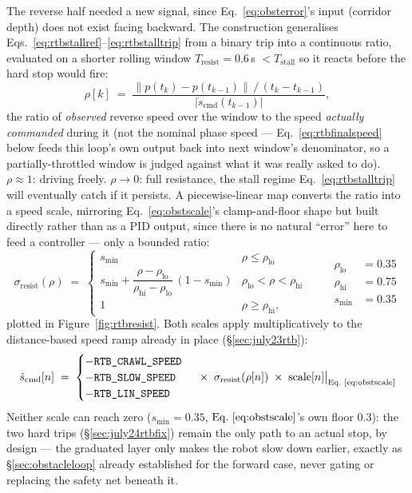 The reverse half needed a new signal, since Eq.~\ref{eq:obsterror}'s input
(corridor depth) does not exist facing backward. The construction generalises
Eqs.~\ref{eq:rtbstallref}--\ref{eq:rtbstalltrip} from a binary trip into a
continuous ratio, evaluated on a shorter rolling window
$T_{\text{resist}}=0.6$\,s $< T_{\text{stall}}$ so it reacts before the hard
stop would fire:
\begin{equation}
\rho[k] \;=\; \frac{\lVert p(t_k) - p(t_{k-1}) \rVert \,/\, (t_k - t_{k-1})}
{\big|\dot s_{\text{cmd}}(t_{k-1})\big|},
\label{eq:rtbresistratio}
\end{equation}
the ratio of \emph{observed} reverse speed over the window to the speed
\emph{actually commanded} during it (not the nominal phase speed —
Eq.~\ref{eq:rtbfinalspeed} below feeds this loop's own output back into
next window's denominator, so a partially-throttled window is judged
against what it was really asked to do). $\rho\approx1$: driving freely.
$\rho\to0$: full resistance, the stall regime Eq.~\ref{eq:rtbstalltrip}
will eventually catch if it persists. A piecewise-linear map converts the
ratio into a speed scale, mirroring Eq.~\ref{eq:obstscale}'s clamp-and-floor
shape but built directly rather than as a PID output, since there is no
natural ``error'' here to feed a controller — only a bounded ratio:
\begin{equation}
\sigma_{\text{resist}}(\rho) \;=\;
\begin{cases}
s_{\min} & \rho \le \rho_{\text{lo}} \\[2pt]
s_{\min} + \dfrac{\rho-\rho_{\text{lo}}}{\rho_{\text{hi}}-\rho_{\text{lo}}}\,(1-s_{\min}) & \rho_{\text{lo}} < \rho < \rho_{\text{hi}} \\[6pt]
1 & \rho \ge \rho_{\text{hi}},
\end{cases}
\qquad
\begin{aligned}
\rho_{\text{lo}} &= 0.35 \\
\rho_{\text{hi}} &= 0.75 \\
s_{\min} &= 0.35
\end{aligned}
\label{eq:rtbresistscale}
\end{equation}
plotted in Figure~\ref{fig:rtbresist}. Both scales apply multiplicatively to
the distance-based speed ramp already in place (\S\ref{sec:july23rtb}):
\begin{equation}
\dot s_{\text{cmd}}[n] \;=\;
\begin{cases}
-\code{RTB\_CRAWL\_SPEED} \\
-\code{RTB\_SLOW\_SPEED} \\
-\code{RTB\_LIN\_SPEED}
\end{cases}
\;\times\; \sigma_{\text{resist}}(\rho[n]) \;\times\; \text{scale}[n]\big|_{\text{Eq.~\ref{eq:obstscale}}}
\label{eq:rtbfinalspeed}
\end{equation}
Neither scale can reach zero ($s_{\min}=0.35$, $\text{Eq.~\ref{eq:obstscale}}$'s
own floor $0.3$): the two hard trips (\S\ref{sec:july24rtbfix}) remain the
only path to an actual stop, by design — the graduated layer only makes
the robot slow down earlier, exactly as \S\ref{sec:obstacleloop} already
established for the forward case, never gating or replacing the safety net
beneath it.

